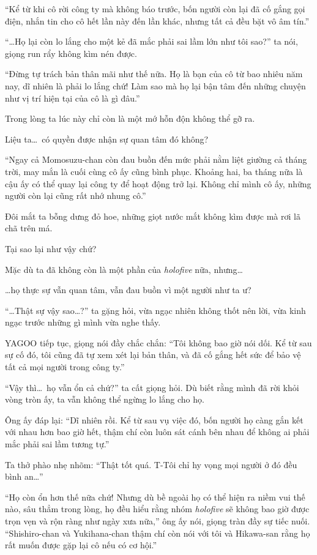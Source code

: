 \documentclass[../main.tex]{subfiles}
\begin{document}
``Kể từ khi cô rời công ty mà không báo trước, bốn người còn lại đã cố gắng gọi điện, nhắn tin cho cô hết lần này đến lần khác, nhưng tất cả đều bặt vô âm tín.''

``\dots Họ lại còn lo lắng cho một kẻ đã mắc phải sai lầm lớn như tôi sao?'' ta nói, giọng run rẩy không kìm nén được.

``Đừng tự trách bản thân mãi như thế nữa. Họ là bạn của cô từ bao nhiêu năm nay, dĩ nhiên là phải lo lắng chứ! Làm sao mà họ lại bận tâm đến những chuyện như vị trí hiện tại của cô là gì đâu.''

Trong lòng ta lúc này chỉ còn là một mớ hỗn độn không thể gỡ ra.

Liệu ta\dots\ có quyền được nhận sự quan tâm đó không?

``Ngay cả Momosuzu-chan còn đau buồn đến mức phải nằm liệt giường cả tháng trời, may mắn là cuối cùng cô ấy cũng bình phục. Khoảng hai, ba tháng nữa là cậu ấy có thể quay lại công ty để hoạt động trở lại. Không chỉ mình cô ấy, những người còn lại cũng rất nhớ nhung cô.''

Đôi mắt ta bỗng dưng đỏ hoe, những giọt nước mắt không kìm được mà rơi lã chã trên má.

Tại sao lại như vậy chứ?

Mặc dù ta đã không còn là một phần của \textit{holofive} nữa, nhưng\dots

\dots họ thực sự vẫn quan tâm, vẫn đau buồn vì một người như ta ư?

``\dots Thật sự vậy sao\dots?'' ta gặng hỏi, vừa ngạc nhiên không thốt nên lời, vừa kinh ngạc trước những gì mình vừa nghe thấy.

YAGOO tiếp tục, giọng nói đầy chắc chắn: ``Tôi không bao giờ nói dối. Kể từ sau sự cố đó, tôi cũng đã tự xem xét lại bản thân, và đã cố gắng hết sức để bảo vệ tất cả mọi người trong công ty.''

``Vậy thì\dots\ họ vẫn ổn cả chứ?'' ta cất giọng hỏi. Dù biết rằng mình đã rời khỏi vòng tròn ấy, ta vẫn không thể ngừng lo lắng cho họ.

Ông ấy đáp lại: ``Dĩ nhiên rồi. Kể từ sau vụ việc đó, bốn người họ càng gắn kết với nhau hơn bao giờ hết, thậm chí còn luôn sát cánh bên nhau để không ai phải mắc phải sai lầm tương tự.''

Ta thở phào nhẹ nhõm: ``Thật tốt quá. T-Tôi chỉ hy vọng mọi người ở đó đều bình an\dots''

``Họ còn ổn hơn thế nữa chứ! Nhưng dù bề ngoài họ có thể hiện ra niềm vui thế nào, sâu thẳm trong lòng, họ đều hiểu rằng nhóm \textit{holofive} sẽ không bao giờ được trọn vẹn và rộn ràng như ngày xưa nữa,'' ông ấy nói, giọng tràn đầy sự tiếc nuối. ``Shishiro-chan và Yukihana-chan thậm chí còn nói với tôi và Hikawa-san rằng họ rất muốn được gặp lại cô nếu có cơ hội.''
\end{document}
